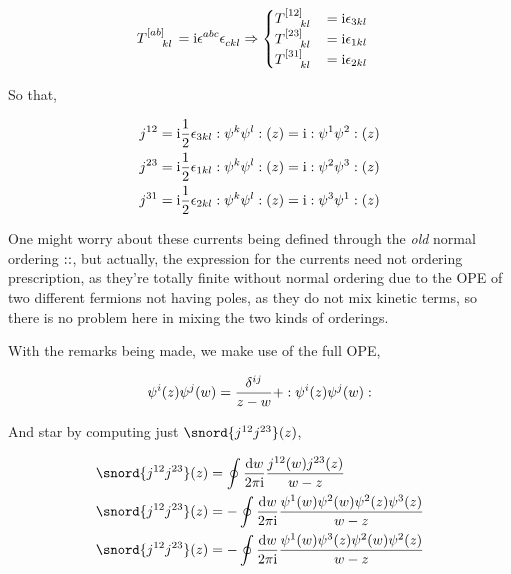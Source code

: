 \begin{align*}
    \tensor{T}{^{\qty[ab]}_k_l}&=\im\tensor{\epsilon}{^a^b^c}\tensor{\epsilon}{_c_k_l}\Rightarrow\begin{cases}
        \tensor{T}{^{\qty[12]}_k_l}&=\im\epsilon_{3kl}\\
        \tensor{T}{^{\qty[23]}_k_l}&=\im\epsilon_{1kl}\\
        \tensor{T}{^{\qty[31]}_k_l}&=\im\epsilon_{2kl}
    \end{cases}
\end{align*}

So that,

\begin{align*}
    j^{12}&=\textnormal{i}\frac1 2\epsilon_{3kl}:\psi^k\psi^l:\qty(z)=\textnormal{i}:\psi^1\psi^2:\qty(z)\\
    j^{23}&=\textnormal{i}\frac1 2\epsilon_{1kl}:\psi^k\psi^l:\qty(z)=\textnormal{i}:\psi^2\psi^3:\qty(z)\\
    j^{31}&=\textnormal{i}\frac1 2\epsilon_{2kl}:\psi^k\psi^l:\qty(z)=\textnormal{i}:\psi^3\psi^1:\qty(z)
\end{align*}

One might worry about these currents being defined through the \textit{old} normal ordering $::$, but actually, the expression 
for the currents need not ordering prescription, as they're totally finite without normal ordering due to the OPE of two different fermions 
not having poles, as they do not mix kinetic terms, so there is no problem here in mixing the two kinds of orderings.

\probitem{}

With the remarks being made, we make use of the full OPE,

\begin{align*}
    \psi^i\qty(z)\psi^j\qty(w)=\frac{\delta^{ij}}{z-w}+:\psi^i\qty(z)\psi^j\qty(w):
\end{align*}

And star by computing just $\snord{j^{12}j^{23}}\qty(z)$,

\begin{align*}
    \snord{j^{12}j^{23}}\qty(z)&=\oint\frac{\dd{w}}{2\pi\im}\frac{j^{12}\qty(w)j^{23}\qty(z)}{w-z}\\
    \snord{j^{12}j^{23}}\qty(z)&=-\oint\frac{\dd{w}}{2\pi\im}\frac{\psi^1\qty(w)\psi^2\qty(w)\psi^2\qty(z)\psi^3\qty(z)}{w-z}\\
    \snord{j^{12}j^{23}}\qty(z)&=-\oint\frac{\dd{w}}{2\pi\im}\frac{\psi^1\qty(w)\psi^3\qty(z)\psi^2\qty(w)\psi^2\qty(z)}{w-z}
\end{align*}

